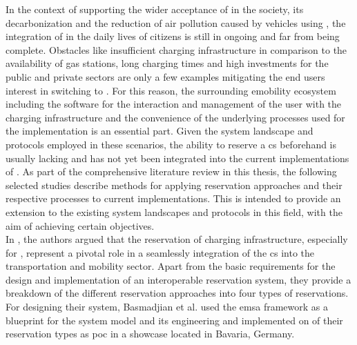 In the context of supporting the wider acceptance of  in the society, its decarbonization and the reduction of air pollution caused by vehicles using  \cite{basmadjian_reference_2020}, the integration of  in the daily lives of citizens is still in ongoing and far from being complete.
Obstacles like insufficient charging infrastructure in comparison to the availability of gas stations, long charging times and high investments for the public and private sectors \cite{basmadjian_reference_2020,orcioni_ev_2020} are only a few examples mitigating the end users interest in switching to .
For this reason, the surrounding \acrshort{emobility} ecosystem including the software for the interaction and management of the user with the charging infrastructure and the convenience of the underlying processes used for the implementation is an essential part.
Given the system landscape and protocols employed in these scenarios, the ability to reserve a \acrshort{cs} beforehand is usually lacking and has not yet been integrated into the current implementations of .
As part of the comprehensive literature review in this thesis, the following selected studies describe methods for applying reservation approaches and their respective processes to current implementations. This is intended to provide an extension to the existing system landscapes and protocols in this field, with the aim of achieving certain objectives. \\
\noindent In \cite{basmadjian_interoperable_2019}, the authors argued that the reservation of charging infrastructure, especially for , represent a pivotal role in a seamlessly integration of the \acrshort{cs} into the transportation and mobility sector.
Apart from the basic requirements for the design and implementation of an interoperable reservation system, they provide a breakdown of the different reservation approaches into four types of reservations. 
For designing their system, Basmadjian et al. used the \acrshort{emsa} \cite{kirpes_e-mobility_2019} framework as a blueprint for the system model and its engineering and implemented on of their reservation types as \acrshort{poc} in a showcase located in Bavaria, Germany.
